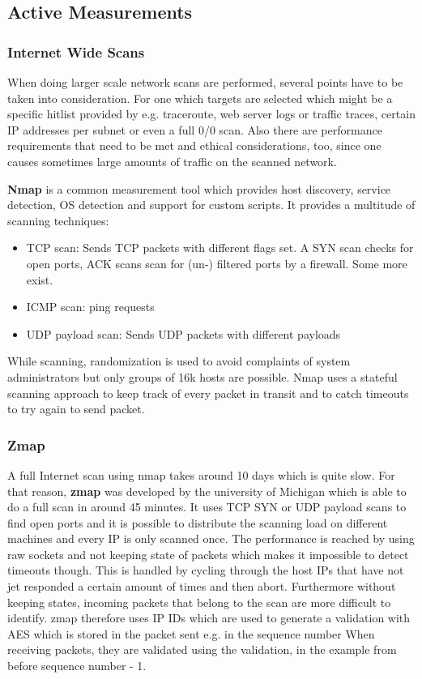 \subsection{Active Measurements}
\subsubsection*{Internet Wide Scans}
When doing larger scale network scans are performed, several points have to be taken into consideration.
For one which targets are selected which might be a specific hitlist provided by e.g. traceroute, web server logs or traffic traces, certain IP addresses per subnet or even a full 0/0 scan.
Also there are performance requirements that need to be met and ethical considerations, too, since one causes sometimes large amounts of traffic on the scanned network.\\
\vspace{5pt}

\textbf{Nmap} is a common measurement tool which provides host discovery, service detection, OS detection and support for custom scripts.
It provides a multitude of scanning techniques:
\begin{itemize}
  \item TCP scan: Sends TCP packets with different flags set. A SYN scan checks for open ports, ACK scans scan for (un-) filtered ports by a firewall. Some more exist.
  \item ICMP scan: ping requests
  \item UDP payload scan: Sends UDP packets with different payloads
\end{itemize}
While scanning, randomization is used to avoid complaints of system administrators but only groups of 16k hosts are possible.
Nmap uses a stateful scanning approach to keep track of every packet in transit and to catch timeouts to try again to send packet.\\

\subsubsection*{Zmap}
A full Internet scan using nmap takes around 10 days which is quite slow.
For that reason, \textbf{zmap} was developed by the university of Michigan which is able to do a full scan in around 45 minutes.
It uses TCP SYN or UDP payload scans to find open ports and it is possible to distribute the scanning load on different machines and every IP is only scanned once.
The performance is reached by using raw sockets and not keeping state of packets which makes it impossible to detect timeouts though.
This is handled by cycling through the host IPs that have not jet responded a certain amount of times and then abort.
Furthermore without keeping states, incoming packets that belong to the scan are more difficult to identify.
zmap therefore uses IP IDs which are used to generate a validation with AES which is stored in the packet sent e.g. in the sequence number
When receiving packets, they are validated using the validation, in the example from before sequence number - 1.
